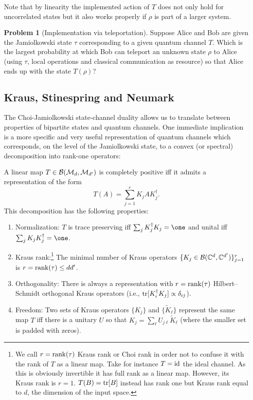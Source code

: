 \documentclass[11pt,a4paper]{article}
\numberwithin{equation}{section}
\theoremstyle{plain}
\theoremstyle{definition}
\newtheorem{problem}{Problem} %
\begin{document}
Note that by linearity the implemented action of $T$ does not only hold for
uncorrelated states but it also works properly if $\rho$ is part of a larger system.

\setcounter{problem}{5}
\begin{problem}[Implementation via teleportation]
Suppose Alice and Bob are given the Jamiolkowski state $\tau$ corresponding to a
given quantum channel $T$. Which is the largest probability at which Bob can
teleport an unknown state $\rho$ to Alice (using $\tau$, local operations and
classical communication as resource) so that Alice ends up with the state $T(\rho)$?
\end{problem}

\subsection{Kraus, Stinespring and Neumark}

The Choi-Jamiolkowski state-channel duality allows us to translate between
properties of bipartite states and quantum channels. One immediate implication is
a more specific and very useful representation of quantum channels which
corresponds, on the level of the Jamiolkowski state, to a convex (or spectral)
decomposition into rank-one operators:

\begin{theorem}
    A linear map $T \in \mathcal{B}(\mathcal{M}_d,\mathcal{M}_{d'})$ is completely positive iff it admits a
    representation of the form
    \begin{equation}\label{eq:2.8}
        T(A) = \sum_{j=1}^r K_j A K_j^\dagger.
    \end{equation}
    This decomposition has the following properties:
    \begin{enumerate}
        \item Normalization: $T$ is trace preserving iff $\sum_j K_j^\dagger K_j = \one$
              and unital iff $\sum_j K_j K_j^\dagger = \one$.
        \item Kraus rank:\footnote{We call $r=\operatorname{rank}(\tau)$ Kraus rank or Choi rank in order
                  not to confuse it with the rank of $T$ as a linear map. Take for instance $T=\mathrm{id}$
                  the ideal channel. As this is obviously invertible it has full rank as a linear
                  map. However, its Kraus rank is $r=1$. $T(B)=\operatorname{tr}[B]$ instead has rank one but
                  Kraus rank equal to $d$, the dimension of the input space.}
              The minimal number of Kraus operators
              $\{K_j \in \mathcal{B}(\mathbb{C}^d,\mathbb{C}^{d'})\}_{j=1}^r$ is
              $r=\operatorname{rank}(\tau)\le dd'$.
        \item Orthogonality: There is always a representation with $r=\operatorname{rank}(\tau)$
              Hilbert--Schmidt orthogonal Kraus operators (i.e., $\operatorname{tr}[K_i^\dagger K_j]\propto \delta_{ij}$).
        \item Freedom: Two sets of Kraus operators $\{K_j\}$ and $\{\widetilde{K}_\ell\}$
              represent the same map $T$ iff there is a unitary $U$ so that
              $K_j=\sum_\ell U_{j\ell}\widetilde{K}_\ell$ (where the smaller set is padded with zeros).
    \end{enumerate}
\end{theorem}
\end{document}
